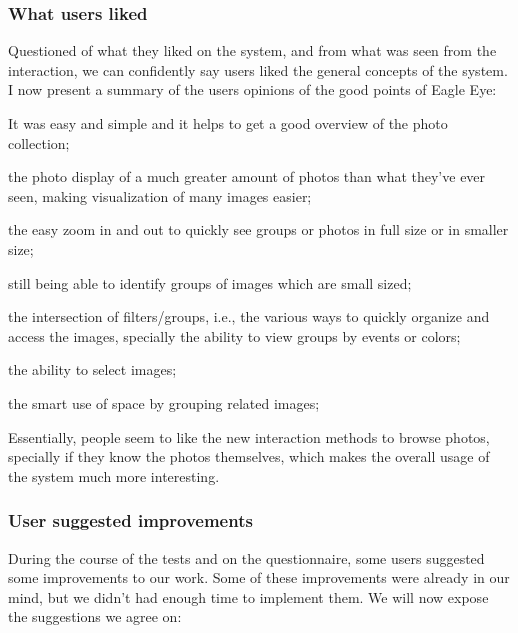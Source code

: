 {\subsubsection{What users liked}

Questioned of what they liked on the system, and from what was seen from the interaction, we can confidently say users liked the general concepts of the system. I now present a summary of the users opinions of the good points of Eagle Eye:

\pagebreak

\begin{myitemize}
\item It was easy and simple and it helps to get a good overview of the photo collection;
\item the photo display of a much greater amount of photos than what they've ever seen, making visualization of many images easier;
\item the easy zoom in and out to quickly see groups or photos in full size or in smaller size;
\item still being able to identify groups of images which are small sized;
\item the intersection of filters/groups, i.e., the various ways to quickly organize and access the images, specially the ability to view groups by events or colors;
\item the ability to select images;
\item the smart use of space by grouping related images;
\end{myitemize}

Essentially, people seem to like the new interaction methods to browse photos, specially if they know the photos themselves, which makes the overall usage of the system much more interesting.




\subsubsection{User suggested improvements}
\label{improvs}

During the course of the tests and on the questionnaire, some users suggested some improvements to our work. Some of these improvements were already in our mind, but we didn't had enough time to implement them. We will now expose the suggestions we agree on:

}
